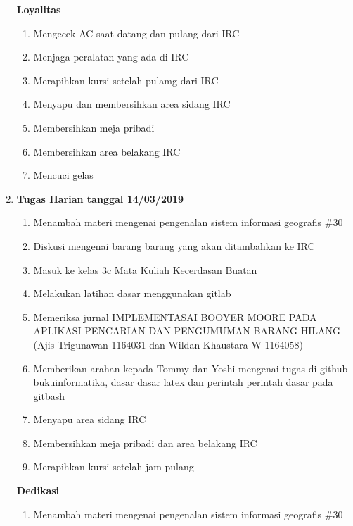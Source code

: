 \begin{enumerate}
\textbf{Loyalitas}
\begin{enumerate}
\item Mengecek AC saat datang dan pulang dari IRC
\item Menjaga peralatan yang ada di IRC
\item Merapihkan kursi setelah pulamg dari IRC
\item Menyapu dan membersihkan area sidang IRC
\item Membersihkan meja pribadi
\item Membersihkan area belakang IRC
\item Mencuci gelas
\end{enumerate}

\item \textbf{Tugas Harian tanggal 14/03/2019}
\begin{enumerate}
\item Menambah materi mengenai pengenalan sistem informasi geografis \#30
\item Diskusi mengenai barang barang yang akan ditambahkan ke IRC
\item Masuk ke kelas 3c Mata Kuliah Kecerdasan Buatan 
\item Melakukan latihan dasar menggunakan gitlab
\item Memeriksa jurnal IMPLEMENTASAI BOOYER MOORE PADA APLIKASI PENCARIAN DAN PENGUMUMAN BARANG HILANG (Ajis Trigunawan 1164031 dan Wildan Khaustara W 1164058)
\item Memberikan arahan kepada Tommy dan Yoshi mengenai tugas di github bukuinformatika, dasar dasar latex dan perintah perintah dasar pada gitbash 
\item Menyapu area sidang IRC
\item Membersihkan meja pribadi dan area belakang IRC
\item Merapihkan kursi setelah jam pulang 
\end{enumerate}

\textbf{Dedikasi}
\begin{enumerate}
\item Menambah materi mengenai pengenalan sistem informasi geografis \#30
\end{enumerate}


\end{enumerate}
